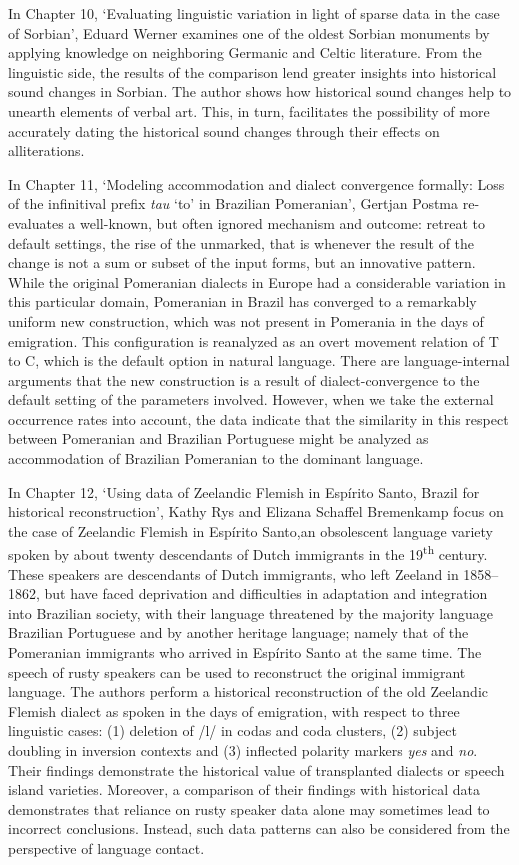 \documentclass[output=paper]{langscibook}
\begin{document}
In Chapter 10, ‘Evaluating linguistic variation in light of sparse data in the case of Sorbian’, Eduard Werner examines one of the oldest Sorbian monuments by applying knowledge on neighboring Germanic and Celtic literature. From the linguistic side, the results of the comparison lend greater insights into historical sound changes in Sorbian. The author shows how historical sound changes help to unearth elements of verbal art. This, in turn, facilitates the possibility of more accurately dating the historical sound changes through their effects on alliterations.

In Chapter 11, ‘Modeling accommodation and dialect convergence formally: Loss of the infinitival prefix \textit{tau} ‘to’ in Brazilian Pomeranian’, Gertjan Postma re-evaluates a well-known, but often ignored mechanism and outcome: retreat to default settings, the rise of the unmarked, that is whenever the result of the change is not a sum or subset of the input forms, but an innovative pattern. While the original Pomeranian dialects in Europe had a considerable variation in this particular domain, Pomeranian in Brazil has converged to a remarkably uniform new construction, which was not present in Pomerania in the days of emigration. This configuration is reanalyzed as an overt movement relation of T to C, which is the default option in natural language. There are language-internal arguments that the new construction is a result of dialect-convergence to the default setting of the parameters involved. However, when we take the external occurrence rates into account, the data indicate that the similarity in this respect between Pomeranian and Brazilian Portuguese might be analyzed as accommodation of Brazilian Pomeranian to the dominant language.


In Chapter 12, ‘Using data of Zeelandic Flemish in Esp\'{i}rito Santo, Brazil for historical reconstruction’, Kathy Rys and Elizana Schaffel Bremenkamp focus on the case of Zeelandic Flemish in Esp\'{i}rito Santo,an obsolescent language variety spoken by about twenty descendants of Dutch immigrants in the 19\textsuperscript{th} century. These speakers are descendants of Dutch immigrants, who left Zeeland in 1858--1862, but have faced deprivation and difficulties in adaptation and integration into Brazilian society, with their language threatened by the majority language Brazilian Portuguese and by another heritage language; namely that of the Pomeranian immigrants who arrived in Esp\'{i}rito Santo at the same time. The speech of rusty speakers can be used to reconstruct the original immigrant language. The authors perform a historical reconstruction of the old Zeelandic Flemish dialect as spoken in the days of emigration, with respect to three linguistic cases: (1) deletion of /l/ in codas and coda clusters, (2) subject doubling in inversion contexts and (3) inflected polarity markers \textit{yes} and \textit{no}. Their findings demonstrate the historical value of transplanted dialects or speech island varieties. Moreover, a comparison of their findings with historical data demonstrates that reliance on rusty speaker data alone may sometimes lead to incorrect conclusions. Instead, such data patterns can also be considered from the perspective of language contact.
\end{document}
